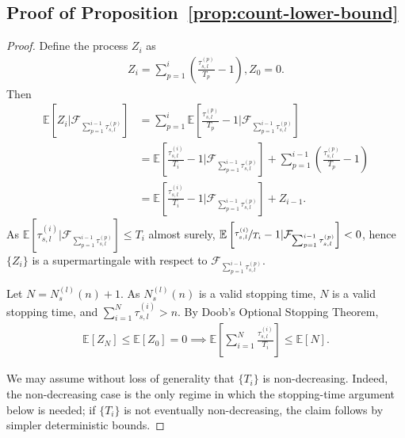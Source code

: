 \documentclass[twoside,11pt]{article}
\newcommand{\pow}[1]{^{(#1)}}%
\numberwithin{equation}{section}
\newcommand{\lp}{\left(}
\newcommand{\rp}{\right)}
\begin{document}
\subsection{Proof of Proposition~\ref{prop:count-lower-bound}}
\label{sec:proof-count-lower-bound}
\begin{proof}
Define the process $Z_i$ as
\begin{align*}
Z_i = \sum_{p=1}^i \lp\frac{\tau_{s,l} \pow p}{T_p} - 1\rp, Z_0 = 0.
\end{align*}
Then 
\begin{align*}
\mathbb{E}\left[Z_i | \mathcal{F}_{\sum_{p=1}^{i-1} \tau_{s,l}\pow{p}}\right] &= \sum_{p=1}^{i} \mathbb{E}\left[\frac{\tau_{s,l} \pow p}{T_p} - 1| \mathcal{F}_{\sum_{p=1}^{i-1} \tau_{s,l}\pow{p}}\right] \\
&= \mathbb{E}\left[\frac{\tau_{s,l} \pow i}{T_i} - 1| \mathcal{F}_{\sum_{p=1}^{i-1} \tau_{s,l}\pow{p}}\right] + \sum_{p=1}^{i-1} \lp\frac{\tau_{s,l} \pow p}{T_p} - 1\rp \\
&= \mathbb{E}\left[\frac{\tau_{s,l} \pow i}{T_i} - 1| \mathcal{F}_{\sum_{p=1}^{i-1} \tau_{s,l}\pow{p}}\right] + Z_{i-1}.
\end{align*}
As $\mathbb{E}[\tau_{s,l} \pow i | \mathcal{F}_{\sum_{p=1}^{i-1} \tau_{s,l}\pow{p}}] \leq T_i$ almost surely, $\mathbb{E}\left[\nicefrac{\tau_{s,l} \pow i}{T_i} - 1| \mathcal{F}_{\sum_{p=1}^{i-1} \tau_{s,l}\pow{p}}\right] < 0$, hence $\{Z_i\}$ is a supermartingale with respect to $\mathcal{F}_{\sum_{p=1}^{i-1} \tau_{s,l}\pow{p}}$.

Let $N = N_s \pow l (n) + 1$.
As $N_s \pow l(n)$ is a valid stopping time, $N$ is a valid stopping time, and $\sum_{i=1}^N \tau_{s,l} \pow i > n$.
By Doob's Optional Stopping Theorem,
\begin{align*}
\mathbb{E}[Z_N] \leq \mathbb{E}[Z_0] = 0 \implies \mathbb{E}\left[\sum_{i=1}^N \frac{\tau_{s,l} \pow i}{T_i}\right] \leq \mathbb{E}[N].
\end{align*}

We may assume without loss of generality that $\{T_i\}$ is non-decreasing.
Indeed, the non-decreasing case is the only regime in which the stopping-time
argument below is needed; if $\{T_i\}$ is not eventually non-decreasing, the
claim follows by simpler deterministic bounds.


\end{proof}
\end{document}
